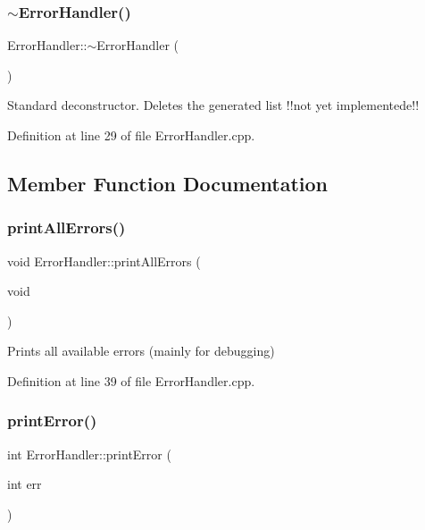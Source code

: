 \mbox{\label{classErrorHandler_a73c7e690b864697e507aaeb537b3c3e5}} 
\subsubsection{\texorpdfstring{$\sim$ErrorHandler()}{~ErrorHandler()}}
{\footnotesize\ttfamily Error\+Handler\+::$\sim$\+Error\+Handler (\begin{DoxyParamCaption}{ }\end{DoxyParamCaption})\hspace{0.3cm}{\ttfamily [virtual]}}

Standard deconstructor. Deletes the generated list !!not yet implementede!! 

Definition at line 29 of file Error\+Handler.\+cpp.



\subsection{Member Function Documentation}
\mbox{\label{classErrorHandler_a1108324c221544c928a2de3a2cf9ba98}} 
\subsubsection{\texorpdfstring{printAllErrors()}{printAllErrors()}}
{\footnotesize\ttfamily void Error\+Handler\+::print\+All\+Errors (\begin{DoxyParamCaption}\item[{void}]{ }\end{DoxyParamCaption})}



Prints all available errors (mainly for debugging) 



Definition at line 39 of file Error\+Handler.\+cpp.

\mbox{\label{classErrorHandler_ab90b8248f24e3129df69d224585956dd}} 
\subsubsection{\texorpdfstring{printError()}{printError()}}
{\footnotesize\ttfamily int Error\+Handler\+::print\+Error (\begin{DoxyParamCaption}\item[{int}]{err }\end{DoxyParamCaption})}



